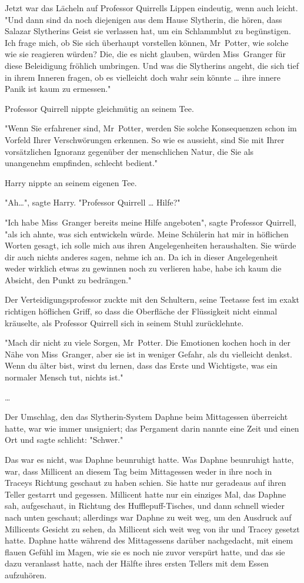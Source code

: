 {Jetzt war das Lächeln auf Professor Quirrells Lippen eindeutig, wenn auch leicht. "Und dann sind da noch diejenigen aus dem Hause Slytherin, die hören, dass Salazar Slytherins Geist sie verlassen hat, um ein Schlammblut zu begünstigen. Ich frage mich, ob Sie sich überhaupt vorstellen können, Mr~Potter, wie solche wie sie reagieren würden? Die, die es nicht glauben, würden Miss~Granger für diese Beleidigung fröhlich umbringen. Und was die Slytherins angeht, die sich tief in ihrem Inneren fragen, ob es vielleicht doch wahr sein könnte … ihre innere Panik ist kaum zu ermessen."

Professor Quirrell nippte gleichmütig an seinem Tee.

"Wenn Sie erfahrener sind, Mr~Potter, werden Sie solche Konsequenzen schon im Vorfeld Ihrer Verschwörungen erkennen. So wie es aussieht, sind Sie mit Ihrer vorsätzlichen Ignoranz gegenüber der menschlichen Natur, die Sie als unangenehm empfinden, schlecht bedient."

Harry nippte an seinem eigenen Tee.

"Ah…", sagte Harry. "Professor Quirrell … Hilfe?"

"Ich habe Miss~Granger bereits meine Hilfe angeboten", sagte Professor Quirrell, "als ich ahnte, was sich entwickeln würde. Meine Schülerin hat mir in höflichen Worten gesagt, ich solle mich aus ihren Angelegenheiten heraushalten. Sie würde dir auch nichts anderes sagen, nehme ich an. Da ich in dieser Angelegenheit weder wirklich etwas zu gewinnen noch zu verlieren habe, habe ich kaum die Absicht, den Punkt zu bedrängen."

Der Verteidigungsprofessor zuckte mit den Schultern, seine Teetasse fest im exakt richtigen höflichen Griff, so dass die Oberfläche der Flüssigkeit nicht einmal kräuselte, als Professor Quirrell sich in seinem Stuhl zurücklehnte.

"Mach dir nicht zu viele Sorgen, Mr~Potter. Die Emotionen kochen hoch in der Nähe von Miss~Granger, aber sie ist in weniger Gefahr, als du vielleicht denkst. Wenn du älter bist, wirst du lernen, dass das Erste und Wichtigste, was ein normaler Mensch tut, nichts ist."

…

Der Umschlag, den das Slytherin-System Daphne beim Mittagessen überreicht hatte, war wie immer unsigniert; das Pergament darin nannte eine Zeit und einen Ort und sagte schlicht: "Schwer."

Das war es nicht, was Daphne beunruhigt hatte. Was Daphne beunruhigt hatte, war, dass Millicent an diesem Tag beim Mittagessen weder in ihre noch in Traceys Richtung geschaut zu haben schien. Sie hatte nur geradeaus auf ihren Teller gestarrt und gegessen. Millicent hatte nur ein einziges Mal, das Daphne sah, aufgeschaut, in Richtung des Hufflepuff-Tisches, und dann schnell wieder nach unten geschaut; allerdings war Daphne zu weit weg, um den Ausdruck auf Millicents Gesicht zu sehen, da Millicent sich weit weg von ihr und Tracey gesetzt hatte. Daphne hatte während des Mittagessens darüber nachgedacht, mit einem flauen Gefühl im Magen, wie sie es noch nie zuvor verspürt hatte, und das sie dazu veranlasst hatte, nach der Hälfte ihres ersten Tellers mit dem Essen aufzuhören.

}
